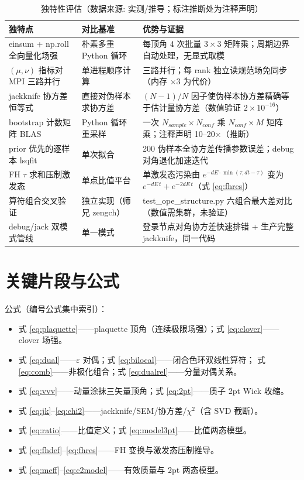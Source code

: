 \documentclass[UTF8]{ctexart}
\begin{document}
\begin{table}[htbp]\centering
\begin{tabularx}{\textwidth}{lXX}
\toprule
\textcolor{algo}{独特点} & 对比基准 & 优势与证据 \\
\midrule
einsum + np.roll 全向量化场强 & 朴素多重 Python 循环 & 每顶角 4 次批量 $3\times3$ 矩阵乘；周期边界自动处理，无显式取模 \\
$(\mu,\nu)$ 指标对 MPI 三路并行 & 单进程顺序计算 & 三路并行；每 rank 独立读规范场免同步（内存 $\times3$ 为代价） \\
jackknife 协方差恒等式 & 直接对伪样本求协方差 & $(N-1)/N$ 因子使伪样本协方差精确等于估计量协方差（数值验证 $2\times10^{-16}$） \\
bootstrap 计数矩阵 BLAS & Python 循环重采样 & 一次 $N_{sample}\times N_{conf}$ 乘 $N_{conf}\times M$ 矩阵乘；注释声明 10--20$\times$（推断） \\
prior 优先的逐样本 lsqfit & 单次拟合 & 200 伪样本全协方差传播参数误差；debug 对角退化加速迭代 \\
FH $\tau$ 求和压制激发态 & 单点比值平台 & 单激发态污染由 $e^{-dE\cdot\min(\tau,dt-\tau)}$ 变为 $e^{-dE\,t}+e^{-2dE\,t}$（式 \eqref{eq:fhres}） \\
算符组合交叉验证 & 独立实现（师兄 zengch） & test\_ope\_structure.py 六组合最大差对比（数值需集群，未验证） \\
debug/jack 双模式管线 & 单一模式 & 登录节点对角协方差快速排错 + 生产完整 jackknife，同一代码 \\
\bottomrule
\end{tabularx}
\caption{独特性评估（数据来源: 实测/推导；标注推断处为注释声明）}
\end{table}

\section{关键片段与公式}

公式（编号公式集中索引）：
\begin{itemize}
\item 式 \eqref{eq:plaquette}——plaquette 顶角（连续极限场强）；式 \eqref{eq:clover}——clover 场强。
\item 式 \eqref{eq:dual}——$\varepsilon$ 对偶；式 \eqref{eq:bilocal}——闭合色环双线性算符；
式 \eqref{eq:comb}——非极化组合；式 \eqref{eq:dualrel}——分量对偶关系。
\item 式 \eqref{eq:vvv}——动量涂抹三矢量顶角；式 \eqref{eq:2pt}——质子 2pt Wick 收缩。
\item 式 \eqref{eq:jk}--\eqref{eq:chi2}——jackknife/SEM/协方差/$\chi^2$（含 SVD 截断）。
\item 式 \eqref{eq:ratio}——比值定义；式 \eqref{eq:model3pt}——比值两态模型。
\item 式 \eqref{eq:fhdef}--\eqref{eq:fhres}——FH 变换与激发态压制推导。
\item 式 \eqref{eq:meff}--\eqref{eq:c2model}——有效质量与 2pt 两态模型。
\end{itemize}
\end{document}
